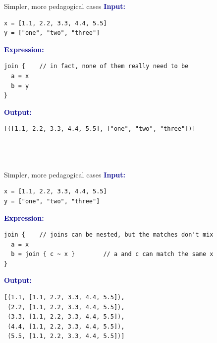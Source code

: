 \documentclass[aspectratio=169]{beamer}
\begin{document}
\begin{frame}[fragile]{Simpler, more pedagogical cases}
\vspace{0.25 cm}
\textcolor{darkblue}{\large\bf Input:}

\begin{verbatim}
x = [1.1, 2.2, 3.3, 4.4, 5.5]
y = ["one", "two", "three"]
\end{verbatim}

\vspace{0.25 cm}
\textcolor{darkblue}{\large\bf Expression:}

\begin{verbatim}
join {    // in fact, none of them really need to be
  a = x
  b = y
}
\end{verbatim}

\vspace{0.25 cm}
\textcolor{darkblue}{\large\bf Output:}

\begin{verbatim}
[([1.1, 2.2, 3.3, 4.4, 5.5], ["one", "two", "three"])]




\end{verbatim}
\end{frame}

\begin{frame}[fragile]{Simpler, more pedagogical cases}
\vspace{0.25 cm}
\textcolor{darkblue}{\large\bf Input:}

\begin{verbatim}
x = [1.1, 2.2, 3.3, 4.4, 5.5]
y = ["one", "two", "three"]
\end{verbatim}

\vspace{0.25 cm}
\textcolor{darkblue}{\large\bf Expression:}

\begin{verbatim}
join {    // joins can be nested, but the matches don't mix
  a = x
  b = join { c ~ x }        // a and c can match the same x
}
\end{verbatim}

\vspace{0.25 cm}
\textcolor{darkblue}{\large\bf Output:}

\begin{verbatim}
[(1.1, [1.1, 2.2, 3.3, 4.4, 5.5]),
 (2.2, [1.1, 2.2, 3.3, 4.4, 5.5]),
 (3.3, [1.1, 2.2, 3.3, 4.4, 5.5]),
 (4.4, [1.1, 2.2, 3.3, 4.4, 5.5]),
 (5.5, [1.1, 2.2, 3.3, 4.4, 5.5])]
\end{verbatim}
\end{frame}
\end{document}
